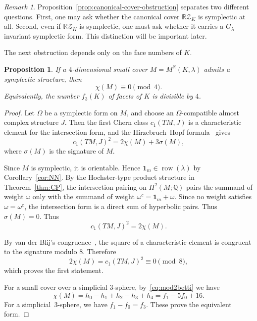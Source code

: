 \documentclass{amsart}
\newtheorem{proposition}[theorem]{Proposition}
\numberwithin{equation}{section}
\theoremstyle{definition}
\theoremstyle{remark}
\newtheorem{remark}[theorem]{Remark}
\newcommand{\R}{\mathbb R}
\newcommand{\Q}{\mathbb Q}
\newcommand{\RZ}{\mathbb R\mathcal Z}
\newcommand{\one}{\mathbf 1}
\DeclareMathOperator{\row}{row}
\begin{document}
\begin{remark} \label{rem:cover-vs-quotient}
    Proposition~\ref{prop:canonical-cover-obstruction} separates two different questions. 
    First, one may ask whether the canonical cover $\RZ_K$ is symplectic at all. 
    Second, even if $\RZ_K$ is symplectic, one must ask whether it carries a $G_\lambda$-invariant symplectic form.
    This distinction will be important later.
\end{remark}

The next obstruction depends only on the face numbers of $K$.
\begin{proposition}\label{prop-wu-obstruction}
    If a $4$-dimensional small cover $M=M^\R(K,\lambda)$ admits a symplectic structure, then
    $$
        \chi(M)\equiv 0\pmod 4.
    $$
    Equivalently, the number $f_3(K)$ of facets of $K$ is divisible by $4$.
\end{proposition}
\begin{proof}
    Let $\Omega$ be a symplectic form on $M$, and choose an $\Omega$-compatible almost complex structure $J$.
    Then the first Chern class $c_1(TM,J)$ is a characteristic element for the intersection form, and the Hirzebruch--Hopf formula~\cite{Hirzebruch-Hopf1958} gives
    \begin{equation}\label{eq:almost_complex_identity}
        c_1(TM,J)^2=2\chi(M)+3\sigma(M),      
    \end{equation}
    where $\sigma(M)$ is the signature of $M$.
    
    Since $M$ is symplectic, it is orientable. 
    Hence $\one_m\in\row(\lambda)$ by Corollary~\ref{cor:NN}.
    By the Hochster-type product structure in Theorem~\ref{thm:CP}, the intersection pairing on $H^2(M;\Q)$ pairs the summand of weight $\omega$ only with the summand of weight $\omega^c=\one_m+\omega$.
    Since no weight satisfies $\omega=\omega^c$, the intersection form is a direct sum of hyperbolic pairs. 
    Thus $\sigma(M)=0$.
    Thus
    $$
        c_1(TM,J)^2=2\chi(M).
    $$
    
    By van der Blij's congruence~\cite{Blij1959}, the square of a characteristic element is congruent to the signature modulo $8$.
    Therefore
    $$
        2\chi(M) = c_1(TM,J)^2 \equiv 0\pmod 8,
    $$
    which proves the first statement.
    
    For a small cover over a simplicial $3$-sphere, by~\eqref{eq:mod2betti} we have
    $$
        \chi(M)=h_0-h_1+h_2-h_3+h_4=f_1 - 5f_0 + 16.
    $$
    For a simplicial~$3$-sphere, we have $f_1-f_0 = f_3$.
    These prove the equivalent form.
\end{proof}
\end{document}

